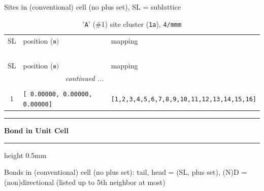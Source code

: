 \documentclass[fleqn,10pt,landscape]{jsarticle}
\begin{document}
\noindent Sites in (conventional) cell (no plus set), SL = sublattice

\renewcommand{\arraystretch}{1.6}
\begin{longtable}[l]{cll}
\captionsetup{justification=raggedright, singlelinecheck=off}
\caption{'\texttt{A}' (\#1) site cluster (\texttt{1a}), \texttt{4/mmm}}
 \\
 \hline \hline
SL & position ($\bm{s})$ & mapping \\ \hline \endfirsthead

\multicolumn{2}{l}{\tablename\ \thetable{}} \\
 \hline \hline
SL & position ($\bm{s})$ & mapping \\ \hline \endhead

 \hline \hline
\multicolumn{2}{r}{\footnotesize\it continued ...} \\ \endfoot

 \hline \hline
\multicolumn{2}{r}{} \\ \endlastfoot

1 & \texttt{[ 0.00000, 0.00000, 0.00000]} & \texttt{[1,2,3,4,5,6,7,8,9,10,11,12,13,14,15,16]} \\
\end{longtable}
\vspace{5mm}
\noindent \rule[0.5mm]{5mm}{0.5mm}\hspace{3mm}\textbf{Bond in Unit Cell}\hspace{3mm}\leaders\hrule height 0.5mm\hfill\kern0pt
\vspace{3mm}

\noindent Bonds in (conventional) cell (no plus set): tail, head = (SL, plus set), (N)D = (non)directional (listed up to 5th neighbor at most)
\end{document}
